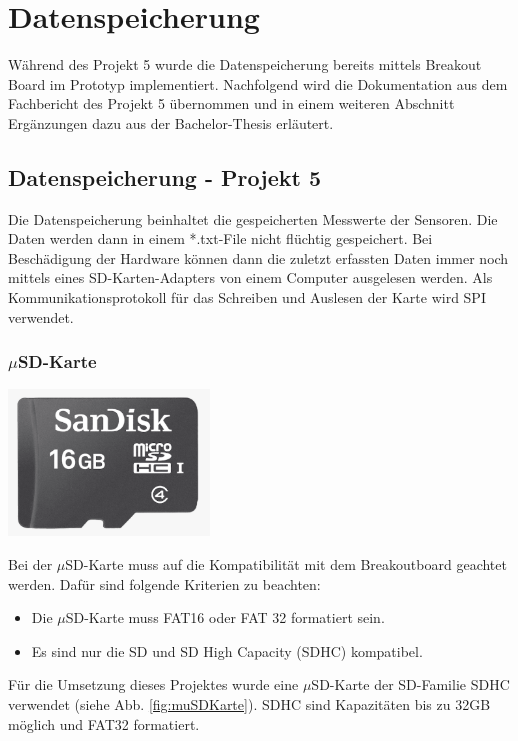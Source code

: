 \chapter{Datenspeicherung}
\label{chap:Datenspeicherung}
Während des Projekt 5 wurde die Datenspeicherung bereits mittels Breakout Board im Prototyp implementiert. Nachfolgend wird die Dokumentation aus dem Fachbericht des Projekt 5 übernommen und in einem weiteren Abschnitt Ergänzungen dazu aus der Bachelor-Thesis erläutert.\\

\section{Datenspeicherung - Projekt 5}
Die Datenspeicherung beinhaltet die gespeicherten Messwerte der Sensoren. Die Daten werden dann in einem *.txt-File nicht flüchtig gespeichert. Bei Beschädigung der Hardware können dann die zuletzt erfassten Daten immer noch mittels eines SD-Karten-Adapters von einem Computer ausgelesen werden. Als Kommunikationsprotokoll für das Schreiben und Auslesen der Karte wird SPI verwendet.\\

\subsection{$\mu$SD-Karte}
\begin{minipage}{0.44\textwidth}
\centering
\includegraphics[width=0.4\textwidth]{graphics/Datenspeicherung/micro_sd_card_16GB.png}
\label{fig:muSDKarte}
\end{minipage}
\begin{minipage}{0.55\textwidth}
Bei der $\mu$SD-Karte muss auf die Kompatibilität mit dem Breakoutboard geachtet werden. Dafür sind folgende Kriterien zu beachten:\\
\begin{itemize}
\item Die $\mu$SD-Karte muss FAT16 oder FAT 32 formatiert sein.
\item Es sind nur die SD und SD High Capacity (SDHC) kompatibel.\\
\end{itemize}
\end{minipage}
Für die Umsetzung dieses Projektes wurde eine $\mu$SD-Karte der SD-Familie SDHC  verwendet (siehe Abb. \ref{fig:muSDKarte}). SDHC sind Kapazitäten bis zu 32GB möglich und FAT32 formatiert. \cite{muSDspez}\\ %

